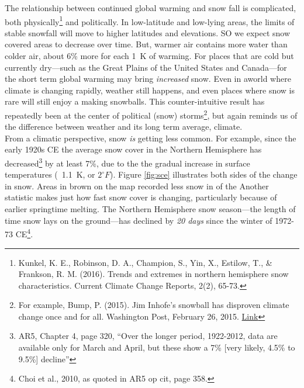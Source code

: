 The relationship between continued global warming and snow fall is complicated, both physically\footnote{Kunkel, K. E., Robinson, D. A., Champion, S., Yin, X., Estilow, T., \& Frankson, R. M. (2016). Trends and extremes in northern hemisphere snow characteristics. Current Climate Change Reports, 2(2), 65-73.} and politically. In low-latitude and low-lying areas, the limits of stable snowfall will move to higher latitudes and elevations. SO we expect snow covered areas to decrease over time. But, warmer air contains more water than colder air, about 6\% more for each \SI{+1}{\kelvin} of warming. For places that are cold but currently dry---such as the Great Plains of the United States and Canada---for the short term global warming may bring \emph{increased} snow. Even in aworld where climate is changing rapidly, weather still happens, and even places where snow is rare will still enjoy a making snowballs. This counter-intuitive result has repeatedly been at the center of political (snow) storms\footnote{For example, Bump, P. (2015). Jim Inhofe's snowball has disproven climate change once and for all. Washington Post, February 26, 2015. \href{https://www.washingtonpost.com/news/the-fix/wp/2015/02/26/jim-inhofes-snowball-has-disproven-climate-change-once-and-for-all/?utm_term=.d10d986358c5}{Link}}, but again reminds us of the difference between weather and its long term average, climate.\\
From a climatic perspective, snow \emph{is} getting less common. For example, since the early 1920s CE the average snow cover in the Northern Hemisphere has decreased\footnote{AR5, Chapter 4, page 320, ``Over the longer period, 1922-2012, data are available only for March and April, but these show a 7\% [very likely, 4.5\% to 9.5\%] decline''} by at least 7\%, due to the the gradual increase in surface temperatures (~\SI{+1.1}{\kelvin}, or $2^{\circ}F$). Figure \ref{fig:sce} illustrates both sides of the change in snow. Areas in brown on the map recorded less snow in  of the Another statistic makes just how fast snow cover is changing, particularly because of earlier springtime melting. The Northern Hemisphere snow season---the length of time snow lays on the ground---has declined by \emph{20 days} since the winter of 1972-73 CE\footnote{Choi et al., 2010, as quoted in AR5 op cit, page 358.}.  



